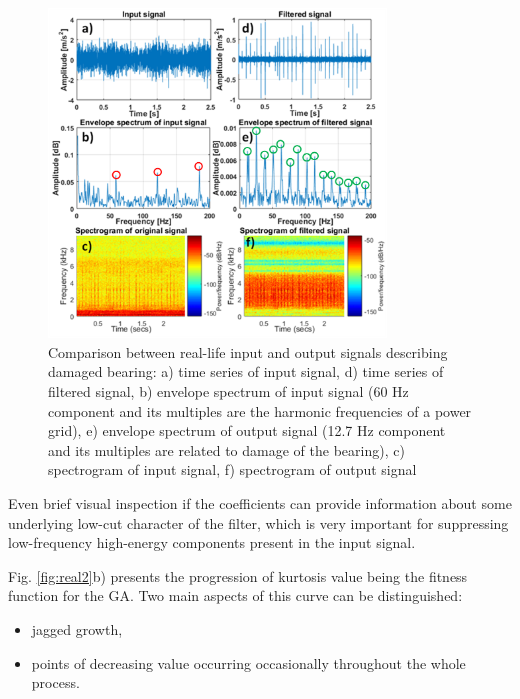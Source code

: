 \documentclass[preprint,12pt]{elsarticle}
\begin{document}
\begin{figure}[ht!]
\centering
\includegraphics[width=0.8\textwidth]{wykresy/real1.png}
\caption{Comparison between real-life input and output signals describing damaged bearing: a) time series of input signal, d) time series of filtered signal, b) envelope spectrum of input signal (60 Hz component and its multiples are the harmonic frequencies of a power grid), e) envelope spectrum of output signal (12.7 Hz component and its multiples are related to damage of the bearing), c) spectrogram of input signal, f) spectrogram of output signal}
\label{fig:real1}
\end{figure}

Even brief visual inspection if the coefficients can provide information about some underlying low-cut character of the filter, which is very important for suppressing low-frequency high-energy components present in the input signal.

Fig. \ref{fig:real2}b) presents the progression of kurtosis value being the fitness function for the GA. Two main aspects of this curve can be distinguished:

\begin{itemize}
    \item jagged growth,
    \item points of decreasing value occurring occasionally throughout the whole process.
\end{itemize}
\end{document}
